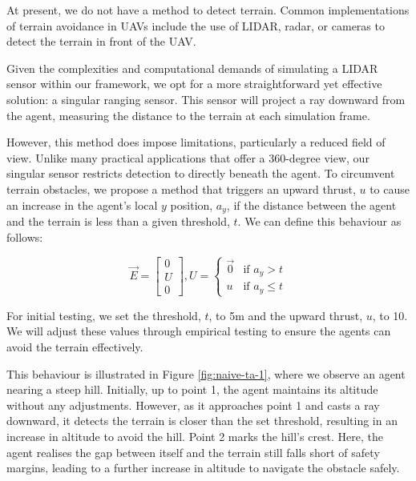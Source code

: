 \documentclass[12pt]{article}
\begin{document}
At present, we do not have a method to detect terrain. Common implementations of terrain avoidance in UAVs include the use of LIDAR, radar, or cameras to detect the terrain in front of the UAV\cite{Petrillo,burwell_2019}. 

Given the complexities and computational demands of simulating a LIDAR sensor within our framework, we opt for a more straightforward yet effective solution: a singular ranging sensor. This sensor will project a ray downward from the agent, measuring the distance to the terrain at each simulation frame.

However, this method does impose limitations, particularly a reduced field of view. Unlike many practical applications that offer a 360-degree view, our singular sensor restricts detection to directly beneath the agent. To circumvent terrain obstacles, we propose a method that triggers an upward thrust, $u$ to cause an increase in the agent's local $y$ position, $a_y$, if the distance between the agent and the terrain is less than a given threshold, $t$. We can define this behaviour as follows:

\begin{equation}
    \vec{E} = \begin{bmatrix}
        0 \\
        U \\
        0
    \end{bmatrix}, U =
    \begin{cases}
        \vec{0} & \text{if } a_y > t \\
        u & \text{if } a_y \leq t
    \end{cases}
\end{equation}

For initial testing, we set the threshold, $t$, to 5m and the upward thrust, $u$, to 10. We will adjust these values through empirical testing to ensure the agents can avoid the terrain effectively.

This behaviour is illustrated in Figure \ref{fig:naive-ta-1}, where we observe an agent nearing a steep hill. Initially, up to point 1, the agent maintains its altitude without any adjustments. However, as it approaches point 1 and casts a ray downward, it detects the terrain is closer than the set threshold, resulting in an increase in altitude to avoid the hill. Point 2 marks the hill's crest. Here, the agent realises the gap between itself and the terrain still falls short of safety margins, leading to a further increase in altitude to navigate the obstacle safely.
\end{document}
